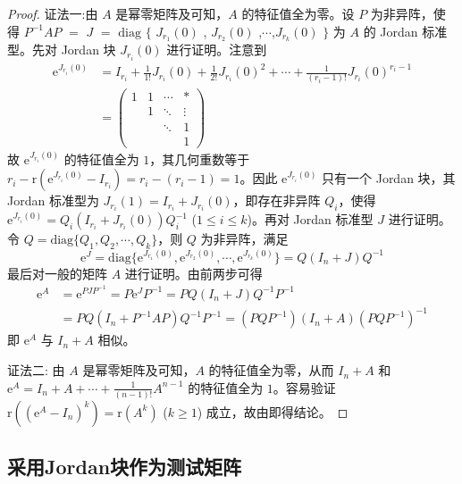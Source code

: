 \documentclass[../../main.tex]{subfiles}
\begin{document}
\begin{proof}
{\color{blue}证法一:}由 $A$ 是幂零矩阵及可知，$A$ 的特征值全为零。设 $P$ 为非异阵，使得 $P^{-1}AP$ $=$ $J$ $=$ $\mathrm{diag}$ $\{$ $J_{r_1}(0)$ , $J_{r_2}(0)$ ,$\cdots$,$J_{r_k}(0)$ $\}$ 为 $A$ 的 Jordan 标准型。先对 Jordan 块 $J_{r_i}(0)$ 进行证明。注意到
\begin{align*}
\mathrm{e}^{J_{r_i}(0)} &= I_{r_i}+\frac{1}{1!}J_{r_i}(0)+\frac{1}{2!}J_{r_i}(0)^2+\cdots+\frac{1}{(r_i - 1)!}J_{r_i}(0)^{r_i - 1}\\
&= 
\begin{pmatrix}
1 & 1 & \cdots & * \\
& 1 & \ddots & \vdots \\
& & \ddots & 1 \\
& & & 1
\end{pmatrix}
\end{align*}
故 $\mathrm{e}^{J_{r_i}(0)}$ 的特征值全为 $1$，其几何重数等于 $r_i - \mathrm{r}(\mathrm{e}^{J_{r_i}(0)}-I_{r_i}) = r_i - (r_i - 1) = 1$。因此 $\mathrm{e}^{J_{r_i}(0)}$ 只有一个 Jordan 块，其 Jordan 标准型为 $J_{r_i}(1) = I_{r_i}+J_{r_i}(0)$，即存在非异阵 $Q_i$，使得 $\mathrm{e}^{J_{r_i}(0)} = Q_i(I_{r_i}+J_{r_i}(0))Q_i^{-1}$ ($1\leqslant  i\leqslant  k$)。再对 Jordan 标准型 $J$ 进行证明。令 $Q = \mathrm{diag}\{Q_1,Q_2,\cdots,Q_k\}$，则 $Q$ 为非异阵，满足
\[
\mathrm{e}^J = \mathrm{diag}\{\mathrm{e}^{J_{r_1}(0)},\mathrm{e}^{J_{r_2}(0)},\cdots,\mathrm{e}^{J_{r_k}(0)}\} = Q(I_n + J)Q^{-1}
\]
最后对一般的矩阵 $A$ 进行证明。由前两步可得
\begin{align*}
\mathrm{e}^A &= \mathrm{e}^{PJP^{-1}} = P\mathrm{e}^JP^{-1} = PQ(I_n + J)Q^{-1}P^{-1}\\
&= PQ(I_n + P^{-1}AP)Q^{-1}P^{-1} = (PQP^{-1})(I_n + A)(PQP^{-1})^{-1}
\end{align*}
即 $\mathrm{e}^A$ 与 $I_n + A$ 相似。

{\color{blue}证法二:}
由 $A$ 是幂零矩阵及可知，$A$ 的特征值全为零，从而 $I_n + A$ 和 $\mathrm{e}^A = I_n+A+\cdots+\frac{1}{(n - 1)!}A^{n - 1}$ 的特征值全为 $1$。容易验证 $\mathrm{r}((\mathrm{e}^A - I_n)^k) = \mathrm{r}(A^k)$ ($k\geqslant  1$) 成立，故由即得结论。
\end{proof}


\subsection{采用Jordan块作为测试矩阵}
\end{document}
